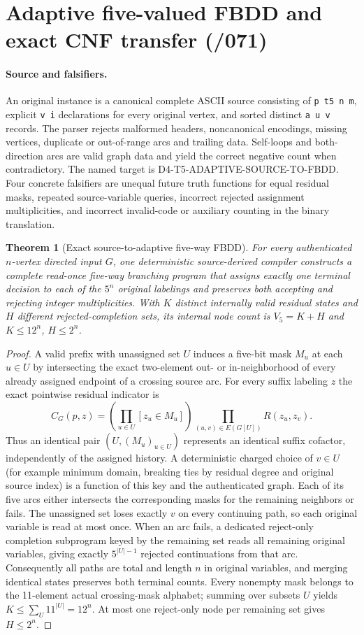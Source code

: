 \documentclass[11pt]{article}
\newtheorem{theorem}{Theorem}
\begin{document}
\section{Adaptive five-valued FBDD and exact CNF transfer (/071)}
\paragraph{Source and falsifiers.}
An original instance is a canonical complete ASCII source consisting
of \texttt{p t5 n m}, explicit \texttt{v i} declarations for every
original vertex, and sorted distinct \texttt{a u v} records.
The parser rejects malformed headers, noncanonical encodings, missing
vertices, duplicate or out-of-range arcs and trailing data. Self-loops
and both-direction arcs are valid graph data and yield the correct
negative count when contradictory. The named target is
D4-T5-ADAPTIVE-SOURCE-TO-FBDD. Four concrete falsifiers are unequal
future truth functions for equal residual masks, repeated source-variable
queries, incorrect rejected assignment multiplicities, and incorrect
invalid-code or auxiliary counting in the binary translation.

\begin{theorem}[Exact source-to-adaptive five-way FBDD]
For every authenticated $n$-vertex directed input $G$, one deterministic
source-derived compiler constructs a complete read-once five-way
branching program that assigns exactly one terminal decision to each
of the $5^n$ original labelings and preserves both accepting and
rejecting integer multiplicities. With $K$ distinct internally valid
residual states and $H$ different rejected-completion sets, its internal
node count is $V_5=K+H$ and $K\le12^n$, $H\le2^n$.
\end{theorem}
\begin{proof}
A valid prefix with unassigned set $U$ induces a five-bit mask
$M_u$ at each $u\in U$ by intersecting the exact two-element
out- or in-neighborhood of every already assigned endpoint of a
crossing source arc. For every suffix labeling $z$ the exact
pointwise residual indicator is
\[
 C_G(p,z)=
 \left(\prod_{u\in U}[z_u\in M_u]\right)
 \prod_{(u,v)\in E(G[U])}R(z_u,z_v).
\]
Thus an identical pair $(U,(M_u)_{u\in U})$ represents an identical
suffix cofactor, independently of the assigned history. A deterministic
charged choice of $v\in U$ (for example minimum domain, breaking ties
by residual degree and original source index) is a function of this
key and the authenticated graph. Each of its five arcs either
intersects the corresponding masks for the remaining neighbors or
fails. The unassigned set loses exactly $v$ on every continuing path,
so each original variable is read at most once. When an arc fails,
a dedicated reject-only completion subprogram keyed by the remaining
set reads all remaining original variables, giving exactly
$5^{|U|-1}$ rejected continuations from that arc. Consequently
all paths are total and length $n$ in original variables, and
merging identical states preserves both terminal counts. Every
nonempty mask belongs to the 11-element actual crossing-mask
alphabet; summing over subsets $U$ yields
$K\le\sum_U11^{|U|}=12^n$. At most one reject-only node
per remaining set gives $H\le2^n$.
\end{proof}
\end{document}

